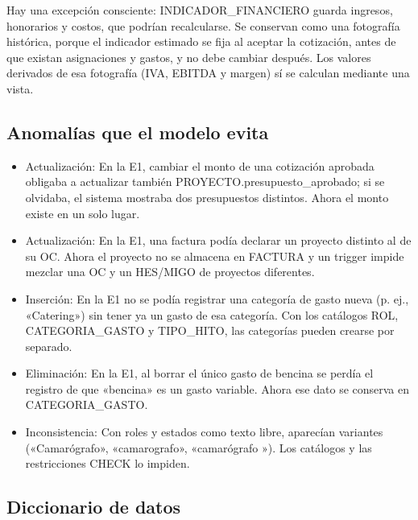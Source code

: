 \documentclass[11pt,letterpaper]{article}
\begin{document}
Hay una excepción consciente: INDICADOR\_FINANCIERO guarda ingresos, honorarios y costos, que podrían recalcularse. Se conservan como una fotografía histórica, porque el indicador estimado se fija al aceptar la cotización, antes de que existan asignaciones y gastos, y no debe cambiar después. Los valores derivados de esa fotografía (IVA, EBITDA y margen) sí se calculan mediante una vista.


\subsection{Anomalías que el modelo evita}

\begin{itemize}[leftmargin=1.5em,itemsep=2pt,topsep=3pt]

\item Actualización: En la E1, cambiar el monto de una cotización aprobada obligaba a actualizar también PROYECTO.presupuesto\_aprobado; si se olvidaba, el sistema mostraba dos presupuestos distintos. Ahora el monto existe en un solo lugar.

\item Actualización: En la E1, una factura podía declarar un proyecto distinto al de su OC. Ahora el proyecto no se almacena en FACTURA y un trigger impide mezclar una OC y un HES/MIGO de proyectos diferentes.

\item Inserción: En la E1 no se podía registrar una categoría de gasto nueva (p. ej., «Catering») sin tener ya un gasto de esa categoría. Con los catálogos ROL, CATEGORIA\_GASTO y TIPO\_HITO, las categorías pueden crearse por separado.

\item Eliminación: En la E1, al borrar el único gasto de bencina se perdía el registro de que «bencina» es un gasto variable. Ahora ese dato se conserva en CATEGORIA\_GASTO.

\item Inconsistencia: Con roles y estados como texto libre, aparecían variantes («Camarógrafo», «camarografo», «camarógrafo »). Los catálogos y las restricciones CHECK lo impiden.

\end{itemize}


\subsection{Diccionario de datos}
\end{document}

